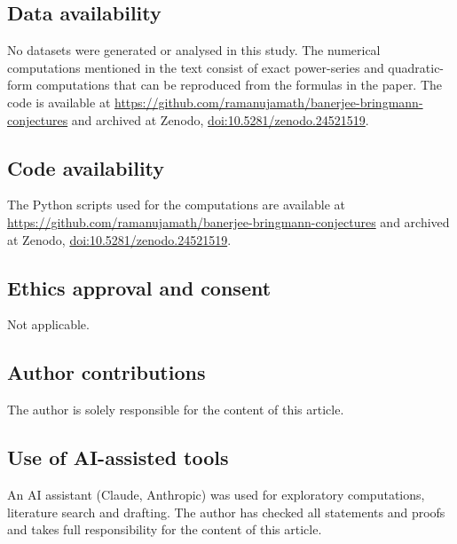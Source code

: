 \documentclass[11pt]{amsart}
\theoremstyle{definition}
\theoremstyle{remark}
\numberwithin{equation}{section}
\begin{document}
\subsection*{Data availability}
No datasets were generated or analysed in this study. The numerical computations mentioned in the text consist of exact power-series and quadratic-form computations that can be reproduced from the formulas in the paper. The code is available at \url{https://github.com/ramanujamath/banerjee-bringmann-conjectures} and archived at Zenodo, \href{https://doi.org/10.5281/zenodo.24521519}{doi:10.5281/zenodo.24521519}.

\subsection*{Code availability}
The Python scripts used for the computations are available at \url{https://github.com/ramanujamath/banerjee-bringmann-conjectures} and archived at Zenodo, \href{https://doi.org/10.5281/zenodo.24521519}{doi:10.5281/zenodo.24521519}.

\subsection*{Ethics approval and consent}
Not applicable.

\subsection*{Author contributions}
The author is solely responsible for the content of this article.

\subsection*{Use of AI-assisted tools}
An AI assistant (Claude, Anthropic) was used for exploratory computations, literature search and drafting. The author has checked all statements and proofs and takes full responsibility for the content of this article.
\end{document}
